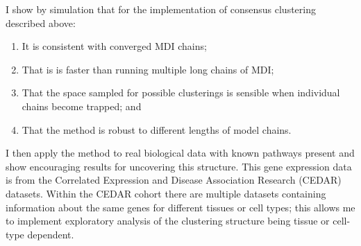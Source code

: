 \documentclass[12pt]{article} %
\begin{document}
	
	
	I show by simulation that for the implementation of consensus clustering described above:
	\begin{enumerate}
		\item It is consistent with converged MDI chains;
		\item That is is faster than running multiple long chains of MDI;
		\item That the space sampled for possible clusterings is sensible when individual chains become trapped; and
		\item That the method is robust to different lengths of model chains.
	\end{enumerate}
	I then apply the method to real biological data with known pathways present and show encouraging results for uncovering this structure. This gene expression data is from the Correlated Expression and Disease Association Research (CEDAR) datasets. Within the CEDAR cohort there are multiple datasets containing information about the same genes for different tissues or cell types; this allows me to implement exploratory analysis of the clustering structure being tissue or cell-type dependent.
	
	
	
	

	
	
\end{document}
